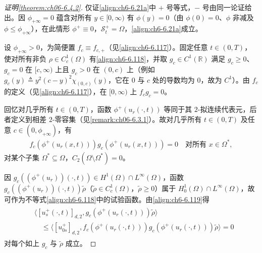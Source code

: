 \documentclass[../../main.tex]{subfiles}%
\begin{document}
\begin{proof}[证明\cref{theorem:ch06-6.4.2}]
仅证\eqref{align:ch6-6.21a}中 $+$ 号等式，$-$ 号由同一论证给出。因 $\phi_{+\infty}=0$ 蕴含对所有 $y\in[0,\infty)$ 有 $\phi(y)=0$（由 $\phi(0)=0$、$\phi$ 非减及 $\phi\leqslant\phi_{+\infty}$），在此情形 $\phi^+\equiv0$，$\mathscr{S}^+_t=\Omega$，\eqref{align:ch6-6.21a}成立。

设 $\phi_{+\infty}>0$，为简便置 $f_c\equiv f_{c,+}$（见\eqref{align:ch6-6.117}）。固定任意 $t\in(0,T)$，使对所有非负 $\rho\in C^1_c(\Omega)$ 有\eqref{align:ch6-6.118}，并取 $g_c\in C^1(\mathbb{R})$ 满足 $g_c\geqslant0$、$g_c=0$ 在 $[c,\infty)$ 上且 $g_c>0$ 在 $(0,c)$ 上（例如 $g_c(y)\triangleq y^2(c-y)^2\chi_{(0,c)}(y)$，它在 $0$ 与 $c$ 处的导数均为 $0$，故为 $C^1$）。由 $f_c$ 的定义（见\eqref{align:ch6-6.117}），在 $[0,\infty)$ 上 $f_cg_c=0$。

回忆对几乎所有 $t\in(0,T)$，函数 $\phi^+(u_r(\cdot,t))$ 等同于其 $2$-拟连续代表元，后者定义到相差 $2$-零容集（见\cref{remark:ch06-6.3.1}）。故对几乎所有 $t\in(0,T)$ 及任意 $c\in(0,\phi_{+\infty})$，有
\begin{align}
f_c(\phi^+(u_r(x,t)))g_c(\phi^+(u_r(x,t)))=0
\quad\text{对所有 }x\in\Omega^*, \label{align:ch6-6.119}
\end{align}
对某个子集 $\Omega^*\subseteq\Omega$，$C_2(\Omega\setminus\Omega^*)=0$。

因 $g_c((\phi^+(u_r))(\cdot,t))\in H^1(\Omega)\cap L^\infty(\Omega)$，函数 $g_c((\phi^+(u_r))(\cdot,t))\widetilde\rho$（$\widetilde\rho\in C^1_c(\Omega)$，$\widetilde\rho\geqslant0$）属于 $H^1_0(\Omega)\cap L^\infty(\Omega)$，故可作为不等式\eqref{align:ch6-6.118}中的试验函数。由\eqref{align:ch6-6.119}得
\begin{align}
\begin{aligned}
&\langle[u^+_s(\cdot,t)]_{d,2},g_c(\phi^+(u_r(\cdot,t)))\widetilde\rho\rangle\\
&\quad\leqslant\langle[u^+_{0s}]_{d,2},f_c(\phi^+(u_r(\cdot,t)))g_c(\phi^+(u_r(\cdot,t)))\widetilde\rho\rangle=0
\end{aligned} 
\label{align:ch6-6.120}
\end{align}
对每个如上 $g_c$ 与 $\widetilde\rho$ 成立。


\end{proof}
\end{document}
